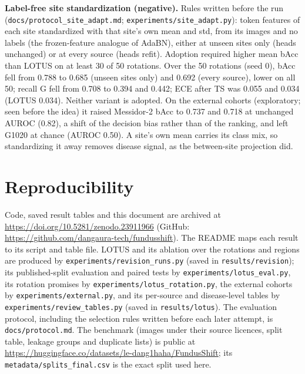 \documentclass[runningheads]{llncs}
\begin{document}
\textbf{Label-free site standardization (negative).} Rules written before the run (\texttt{docs/protocol\_site\_adapt.md}; \texttt{experiments/site\_adapt.py}): token features of each site standardized with that site's own mean and std, from its images and no labels (the frozen-feature analogue of AdaBN), either at unseen sites only (heads unchanged) or at every source (heads refit). Adoption required higher mean bAcc than LOTUS on at least 30 of 50 rotations. Over the 50 rotations (seed 0), bAcc fell from 0.788 to 0.685 (unseen sites only) and 0.692 (every source), lower on all 50; recall G fell from 0.708 to 0.394 and 0.442; ECE after TS was 0.055 and 0.034 (LOTUS 0.034). Neither variant is adopted. On the external cohorts (exploratory; seen before the idea) it raised Messidor-2 bAcc to 0.737 and 0.718 at unchanged AUROC (0.82), a shift of the decision bias rather than of the ranking, and left G1020 at chance (AUROC 0.50). A site's own mean carries its class mix, so standardizing it away removes disease signal, as the between-site projection did.

\section{Reproducibility}\label{s:repro}
\sloppy
Code, saved result tables and this document are archived at \url{https://doi.org/10.5281/zenodo.23911966} (GitHub: \url{https://github.com/dangaura-tech/fundusshift}). The README maps each result to its script and table file. LOTUS and its ablation over the rotations and regions are produced by \texttt{experiments/revision\_runs.py} (saved in \texttt{results/revision}); its published-split evaluation and paired tests by \texttt{experiments/lotus\_eval.py}, its rotation promises by \texttt{experiments/lotus\_rotation.py}, the external cohorts by \texttt{experiments/external.py}, and its per-source and disease-level tables by \texttt{experiments/review\_tables.py} (saved in \texttt{results/lotus}). The evaluation protocol, including the selection rules written before each later attempt, is \texttt{docs/protocol.md}. The benchmark (images under their source licences, split table, leakage groups and duplicate lists) is public at \url{https://huggingface.co/datasets/le-dang1haha/FundusShift}; its \texttt{metadata/splits\_final.csv} is the exact split used here.
\end{document}
